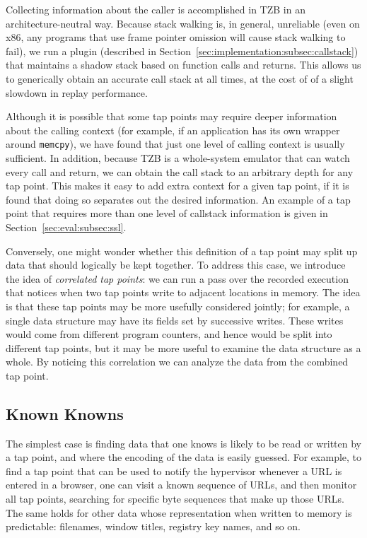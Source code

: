 Collecting information about the caller is accomplished in TZB in an
architecture-neutral way. Because stack walking is, in general,
unreliable (even on x86, any programs that use frame pointer omission
will cause stack walking to fail), we run a plugin (described in
Section~\ref{sec:implementation:subsec:callstack}) that maintains a
shadow stack based on function calls and returns. This allows us to
generically obtain an accurate call stack at all times, at the cost of
of a slight slowdown in replay performance.

Although it is possible that some tap points may require deeper
information about the calling context (for example, if an application
has its own wrapper around \texttt{memcpy}), we have found that just one
level of calling context is usually sufficient. In addition, because TZB
is a whole-system emulator that can watch every call and return, we can
obtain the call stack to an arbitrary depth for any tap point. This
makes it easy to add extra context for a given tap point, if it is found
that doing so separates out the desired information. An example of a tap
point that requires more than one level of callstack information is
given in Section~\ref{sec:eval:subsec:ssl}.

Conversely, one might wonder whether this definition of a tap point may
split up data that should logically be kept together. To address this
case, we introduce the idea of \emph{correlated tap points}: we can run
a pass over the recorded execution that notices when two tap points
write to adjacent locations in memory. The idea is that these tap points
may be more usefully considered jointly; for example, a single data
structure may have its fields set by successive writes. These writes
would come from different program counters, and hence would be split
into different tap points, but it may be more useful to examine the data
structure as a whole. By noticing this correlation we can analyze the
data from the combined tap point.

\subsection{Known Knowns}

The simplest case is finding data that one knows is likely to be read or
written by a tap point, and where the encoding of the data is easily
guessed. For example, to find a tap point that can be used to notify
the hypervisor whenever a URL is entered in a browser, one can visit a
known sequence of URLs, and then monitor all tap points, searching for
specific byte sequences that make up those URLs. The same holds for
other data whose representation when written to memory is predictable:
filenames, window titles, registry key names, and so on.

